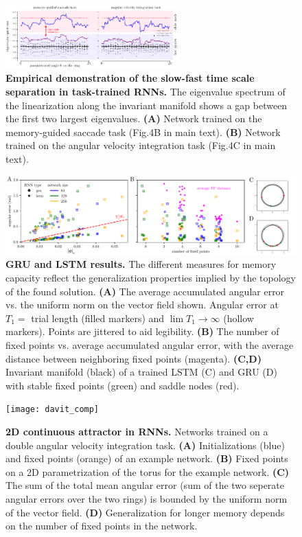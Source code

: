 \documentclass[letterpaper]{article}
\begin{document}
\begin{figure}[th!]
  \centering
  \includegraphics[width=0.6\textwidth]{eigenvalue_gap_comp}
  \caption{\textbf{Empirical demonstration of the slow-fast time scale separation in task-trained RNNs.}
      The eigenvalue spectrum of the linearization along the invariant manifold shows a gap between the first two largest eigenvalues.
    \textbf{(A)} Network trained on the memory-guided saccade task (Fig.4B in main text).
    \textbf{(B)} Network trained on the angular velocity integration task (Fig.4C in main text).
}\label{fig:eigenvalue_gap}
\end{figure}
\begin{figure}[h!]
  \centering
  \includegraphics[width=.9\textwidth]{angular_losses_lstm_gru}
  \caption{\textbf{GRU and LSTM results.}
      The different measures for memory capacity reflect the generalization properties implied by the topology of the found solution.
    \textbf{(A)} The average accumulated angular error vs. the uniform norm on the vector field shown.
     Angular error at \(T_1 =\) trial length (filled markers) and \(\lim T_{1} \to \infty\)  (hollow markers).
      Points are jittered to aid legibility.
    \textbf{(B)} The number of fixed points vs. average accumulated angular error, with the average distance between neighboring fixed points (magenta).
    \textbf{(C,D)} Invariant manifold (black) of a trained LSTM (C) and GRU (D) with stable fixed points (green) and saddle nodes (red).
}\label{fig:angular_losses_lstm_gru}
\end{figure}
\begin{figure}[h!]
  \centering
  \texttt{[image: davit\_comp]}
  \caption{\textbf{2D continuous attractor in RNNs.}
      Networks trained on a double angular velocity integration task.
    \textbf{(A)} Initializations (blue) and fixed points (orange) of an example network.
    \textbf{(B)} Fixed points on a 2D parametrization of the torus for the example network.
    \textbf{(C)} The sum of the total mean angular error (sum of the two seperate angular errors over the two rings) is bounded by the uniform norm of the vector field.
    \textbf{(D)} Generalization for longer memory depends on the number of fixed points in the network.
}\label{fig:davit}
\end{figure}
\end{document}
